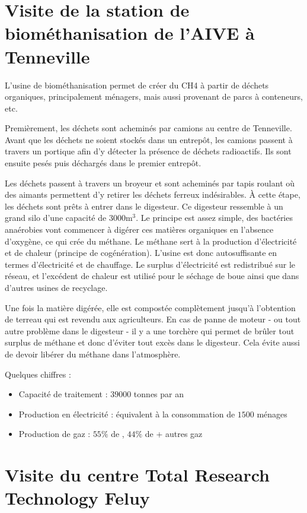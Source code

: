 \section{Visite de la station de biométhanisation de l’AIVE à Tenneville}

L’usine de biométhanisation permet de créer du CH4 à partir de déchets organiques,
principalement ménagers, mais aussi provenant de parcs à conteneurs, etc.

Premièrement, les déchets sont acheminés par camions au centre de Tenneville.
Avant que les déchets ne soient stockés dans un entrepôt, les camions passent à travers un portique afin 
d'y détecter la présence de déchets radioactifs. Ils sont ensuite pesés
puis déchargés dans le premier entrepôt.

Les déchets passent à travers un broyeur et sont acheminés par tapis roulant 
où des aimants permettent d’y retirer les déchets ferreux indésirables.
À cette étape, les déchets sont prêts à entrer dans le digesteur. 
Ce digesteur ressemble à un grand silo d’une capacité de $3000 \si{\meter\cubed}$.
Le principe est assez simple, des bactéries anaérobies vont commencer à digérer 
ces matières organiques en l’absence d’oxygène, ce qui crée du méthane. 
Le méthane sert à la production d’électricité et de chaleur (principe de cogénération).
L’usine est donc autosuffisante en termes d'électricité et de chauffage.
Le surplus  d’électricité est redistribué sur le réseau, et l’excédent de chaleur 
est utilisé pour le séchage de boue ainsi que dans d’autres usines de recyclage. 

Une fois la matière digérée, elle est compostée complètement jusqu’à l’obtention 
de terreau qui est revendu aux agriculteurs.
En cas de panne de moteur - ou tout autre problème dans le digesteur -
il y a une torchère qui permet de brûler tout surplus de méthane
et donc d'éviter tout excès dans le digesteur. Cela évite aussi de devoir 
libérer du méthane dans l’atmosphère.

Quelques chiffres :
\begin{itemize}
	\item Capacité de traitement : $39 000$ tonnes par an
	\item Production en électricité : équivalent à la consommation de $1500$ ménages
	\item Production de gaz : $55\%$ de , $44\%$ de  + autres gaz
\end{itemize}

\section{Visite du centre Total Research Technology Feluy}

